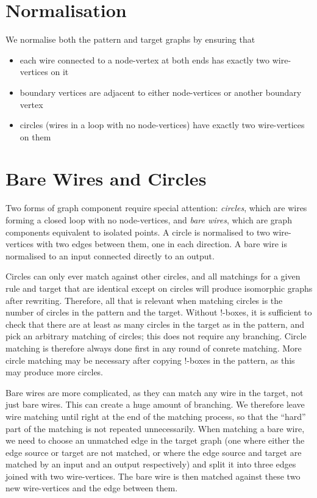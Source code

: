 \documentclass{article}
\begin{document}
\section{Normalisation}

We normalise both the pattern and target graphs by ensuring that
\begin{itemize}
\item each wire connected to a node-vertex at both ends has exactly two wire-vertices on it
\item boundary vertices are adjacent to either node-vertices or another boundary vertex
\item circles (wires in a loop with no node-vertices) have exactly two wire-vertices on them
\end{itemize}

\section{Bare Wires and Circles}

Two forms of graph component require special attention: \emph{circles}, which are wires forming a closed loop with no node-vertices, and \emph{bare wires}, which are graph components equivalent to isolated points.  A circle is normalised to two wire-vertices with two edges between them, one in each direction.  A bare wire is normalised to an input connected directly to an output.

Circles can only ever match against other circles, and all matchings for a given rule and target that are identical except on circles will produce isomorphic graphs after rewriting.  Therefore, all that is relevant when matching circles is the number of circles in the pattern and the target.  Without $!$-boxes, it is sufficient to check that there are at least as many circles in the target as in the pattern, and pick an arbitrary matching of circles; this does not require any branching.  Circle matching is therefore always done first in any round of conrete matching.  More circle matching may be necessary after copying $!$-boxes in the pattern, as this may produce more circles.

Bare wires are more complicated, as they can match any wire in the target, not just bare wires.  This can create a huge amount of branching.  We therefore leave wire matching until right at the end of the matching process, so that the ``hard'' part of the matching is not repeated unnecessarily.  When matching a bare wire, we need to choose an unmatched edge in the target graph (one where either the edge source or target are not matched, or where the edge source and target are matched by an input and an output respectively) and split it into three edges joined with two wire-vertices.  The bare wire is then matched against these two new wire-vertices and the edge between them.
\end{document}
